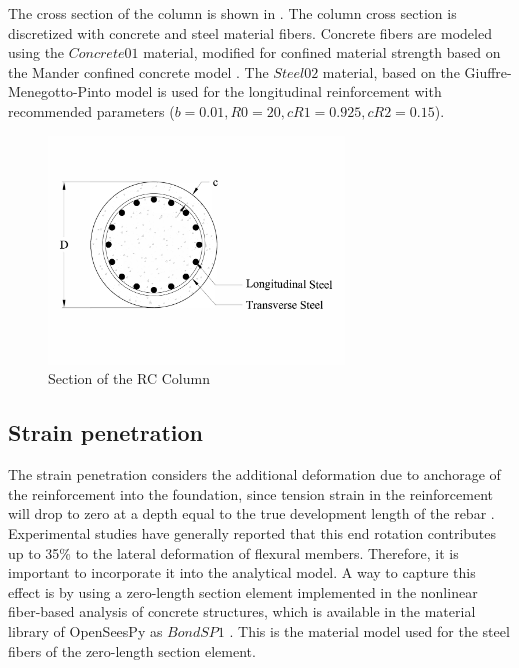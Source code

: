 The cross section of the column is shown in . The column cross section is discretized with concrete and steel material fibers. Concrete fibers are modeled using the $Concrete01$ material, modified for confined material strength based on the Mander confined concrete model \cite{Mander1988}. The $Steel02$ material, based on the Giuffre-Menegotto-Pinto model \cite{Filippou1983} is used for the longitudinal reinforcement with recommended parameters ($b = 0.01, R0 = 20, cR1 = 0.925, cR2 = 0.15$). 

\begin{figure}[htbp]
	\centering
	\includegraphics[width=0.7\textwidth]{Chapter-5/figs/StructuralModel_Section}
	\caption{Section of the RC Column}
	\label{fig:ColumnSection}
\end{figure}
\subsection{Strain penetration}

The strain penetration considers the additional deformation due to anchorage of the reinforcement into the foundation, since tension strain in the reinforcement will drop to zero at a depth equal to the true development length of the rebar \cite{Priestley2007}. Experimental studies have generally reported that this end rotation contributes up to 35\% to the lateral deformation of flexural members\cite{Zhao2007}. Therefore, it is important to incorporate it into the analytical model. A way to capture this effect is by using a zero-length section element implemented in the nonlinear fiber-based analysis of concrete structures, which is available in the material library of OpenSeesPy as $Bond SP1$ \cite{Zhao2007}. This is the material model used for the steel fibers of the zero-length section element.


